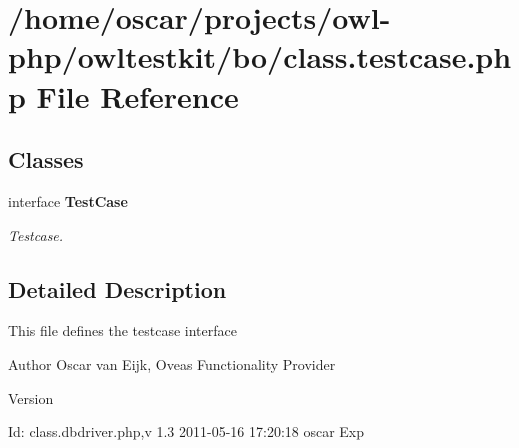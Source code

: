 \section{/home/oscar/projects/owl-\/php/owltestkit/bo/class.testcase.php File Reference}
\label{class_8testcase_8php}
\subsection*{Classes}
\begin{DoxyCompactItemize}
\item 
interface {\bf TestCase}
\begin{DoxyCompactList}\small\item\em Testcase. \end{DoxyCompactList}\end{DoxyCompactItemize}


\subsection{Detailed Description}
This file defines the testcase interface \begin{DoxyAuthor}{Author}
Oscar van Eijk, Oveas Functionality Provider 
\end{DoxyAuthor}
\begin{DoxyVersion}{Version}

\end{DoxyVersion}
\begin{DoxyParagraph}{Id:}
class.dbdriver.php,v 1.3 2011-\/05-\/16 17:20:18 oscar Exp 
\end{DoxyParagraph}
